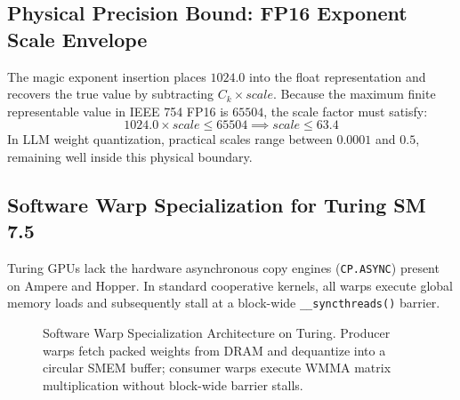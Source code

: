 \documentclass[10pt,twocolumn,letterpaper]{article}
\begin{document}
\subsection{Physical Precision Bound: FP16 Exponent Scale Envelope}
The magic exponent insertion places $1024.0$ into the float representation and recovers the true value by subtracting $C_k \times scale$. Because the maximum finite representable value in IEEE 754 FP16 is $65504$, the scale factor must satisfy:
\begin{equation}
1024.0 \times scale \le 65504 \implies scale \le 63.4
\end{equation}
In LLM weight quantization, practical scales range between $0.0001$ and $0.5$, remaining well inside this physical boundary.

\subsection{Software Warp Specialization for Turing SM 7.5}
Turing GPUs lack the hardware asynchronous copy engines (\texttt{CP.ASYNC}) present on Ampere and Hopper. In standard cooperative kernels, all warps execute global memory loads and subsequently stall at a block-wide \texttt{\_\_syncthreads()} barrier.

\begin{figure}[t]
\centering
{}
\caption{Software Warp Specialization Architecture on Turing. Producer warps fetch packed weights from DRAM and dequantize into a circular SMEM buffer; consumer warps execute WMMA matrix multiplication without block-wide barrier stalls.}
\label{fig:warp_spec}
\end{figure}
\end{document}
